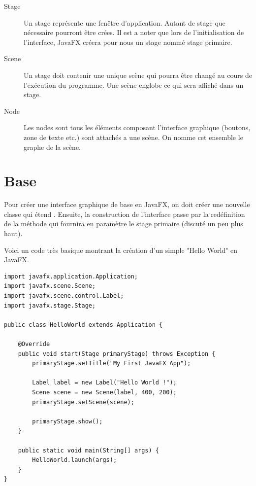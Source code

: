 \begin{appendix}
\begin{description}
  \item [Stage] Un stage représente une fenêtre d'application. Autant de stage que nécessaire pourront être crées. Il est a noter que lors de l'initialisation de l'interface, JavaFX créera pour nous un stage nommé stage primaire.
  \item [Scene] Un stage doit contenir une unique scène qui pourra être changé au cours de l'exécution du programme. Une scène englobe ce qui sera affiché dans un stage.
  \item [Node] Les nodes sont tous les éléments composant l'interface graphique (boutons, zone de texte etc.) sont attachés a une scène. On nomme cet ensemble le graphe de la scène. 
\end{description}

\section{Base}

Pour créer une interface graphique de base en JavaFX, on doit créer une nouvelle classe qui étend . Ensuite, la construction de l'interface passe par la redéfinition de la méthode  qui fournira en paramètre le stage primaire (discuté un peu plus haut).

Voici un code très basique montrant la création d'un simple "Hello World" en JavaFX. 

\begin{codeblock}
\begin{verbatim}
import javafx.application.Application;
import javafx.scene.Scene;
import javafx.scene.control.Label;
import javafx.stage.Stage;

public class HelloWorld extends Application {

    @Override
    public void start(Stage primaryStage) throws Exception {
        primaryStage.setTitle("My First JavaFX App");
        
        Label label = new Label("Hello World !");
        Scene scene = new Scene(label, 400, 200);
        primaryStage.setScene(scene);
        
        primaryStage.show();
    }

    public static void main(String[] args) {
        HelloWorld.launch(args);
    }
}
\end{verbatim}
\end{codeblock}


\end{appendix}
